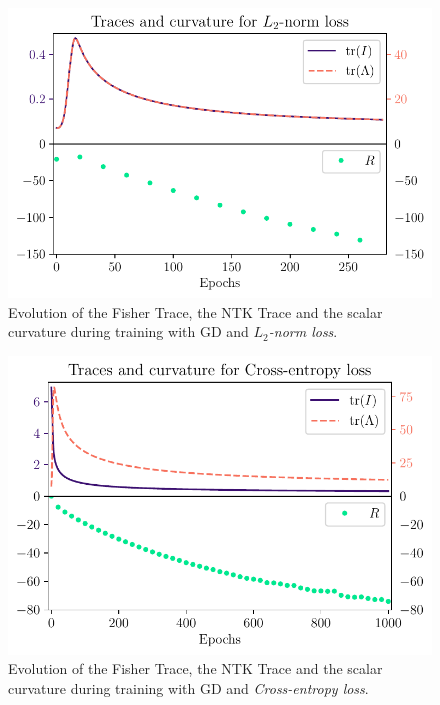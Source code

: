 \begin{figure}
	\centering
	\includegraphics{Experiment2/plots/LPNormLoss2_Curves.pdf}
	\caption{Evolution of the Fisher Trace, the NTK Trace and the scalar curvature during training with GD and \emph{$L_2$-norm loss}.}
	\label{fig:Results2LPNormLossCurves}
\end{figure}
\begin{figure}
	\centering
	\includegraphics{Experiment2/plots/CrossEntropyLoss_Curves.pdf}
	\caption{Evolution of the Fisher Trace, the NTK Trace and the scalar curvature during training with GD and \emph{Cross-entropy loss}.}
	\label{fig:Results2CrossEntropyLossCurves}
\end{figure}
